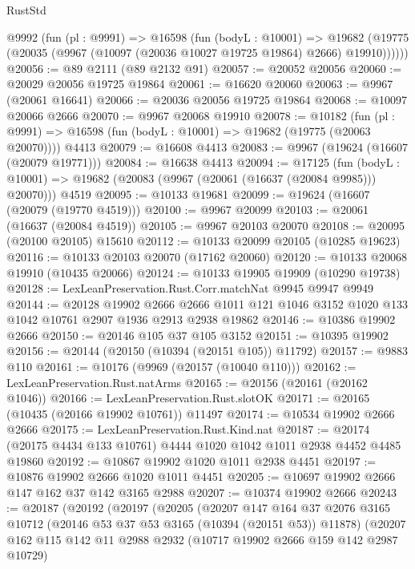 \begin{lexlean}{RustStd}
\begin{coremodule}
{\begin{coremodule}
{{{{{{{{{{{{{{{{{{{{{{{{{{{{{{{{{{{{{{{{{{{{{{{{{{{{{{{{{{{{{{{{{{{{{{{{{{{{{{    @9992
      (fun (pl : @9991) =>
      @16598
        (fun (bodyL : @10001) =>
        @19682 (@19775 (@20035 (@9967 (@10097 (@20036 @10027 @19725 @19864) @2666) @19910))))))
@20056 := @89 @2111 (@89 @2132 @91)
@20057 := @20052 @20056
@20060 := @20029 @20056 @19725 @19864
@20061 := @16620 @20060
@20063 := @9967 (@20061 @16641)
@20066 := @20036 @20056 @19725 @19864
@20068 := @10097 @20066 @2666
@20070 := @9967 @20068 @19910
@20078 := @10182
    (fun (pl : @9991) => @16598 (fun (bodyL : @10001) => @19682 (@19775 (@20063 @20070))))
    @4413
@20079 := @16608 @4413
@20083 := @9967 (@19624 (@16607 (@20079 @19771)))
@20084 := @16638 @4413
@20094 := @17125
    (fun (bodyL : @10001) => @19682 (@20083 (@9967 (@20061 (@16637 (@20084 @9985))) @20070)))
    @4519
@20095 := @10133 @19681
@20099 := @19624 (@16607 (@20079 (@19770 @4519)))
@20100 := @9967 @20099
@20103 := @20061 (@16637 (@20084 @4519))
@20105 := @9967 @20103 @20070
@20108 := @20095 (@20100 @20105) @15610
@20112 := @10133 @20099 @20105 (@10285 @19623)
@20116 := @10133 @20103 @20070 (@17162 @20060)
@20120 := @10133 @20068 @19910 (@10435 @20066)
@20124 := @10133 @19905 @19909 (@10290 @19738)
@20128 := LexLeanPreservation.Rust.Corr.matchNat @9945 @9947 @9949
@20144 := @20128
    @19902
    @2666
    @2666
    @1011
    @121
    @1046
    @3152
    @1020
    @133
    @1042
    @10761
    @2907
    @1936
    @2913
    @2938
    @19862
@20146 := @10386 @19902 @2666
@20150 := @20146 @105 @37 @105 @3152
@20151 := @10395 @19902
@20156 := @20144 (@20150 (@10394 (@20151 @105)) @11792)
@20157 := @9883 @110
@20161 := @10176 (@9969 (@20157 (@10040 @110)))
@20162 := LexLeanPreservation.Rust.natArms
@20165 := @20156 (@20161 (@20162 @1046))
@20166 := LexLeanPreservation.Rust.slotOK
@20171 := @20165 (@10435 (@20166 @19902 @10761)) @11497
@20174 := @10534 @19902 @2666 @2666
@20175 := LexLeanPreservation.Rust.Kind.nat
@20187 := @20174 (@20175 @4434 @133 @10761) @4444 @1020 @1042 @1011 @2938 @4452 @4485 @19860
@20192 := @10867 @19902 @1020 @1011 @2938 @4451
@20197 := @10876 @19902 @2666 @1020 @1011 @4451
@20205 := @10697 @19902 @2666 @147 @162 @37 @142 @3165 @2988
@20207 := @10374 @19902 @2666
@20243 := @20187
    (@20192
      (@20197
        (@20205
          (@20207
            @147
            @164
            @37
            @2076
            @3165
            @10712
            (@20146 @53 @37 @53 @3165 (@10394 (@20151 @53)) @11878)
            (@20207
              @162
              @115
              @142
              @11
              @2988
              @2932
              (@10717 @19902 @2666 @159 @142 @2987 @10729)
}}}}}}}}}}}}}}}}}}}}}}}}}}}}}}}}}}}}}}}}}}}}}}}}}}}}}}}}}}}}}}}}}}}}}}}}}}}}}}
\end{coremodule}}
\end{coremodule}
\end{lexlean}
